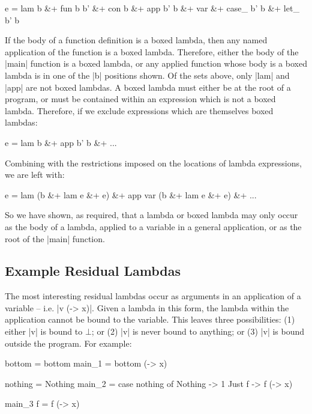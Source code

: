 \ignore\begin{code}
e =  lam b &+ fun b b' &+ con b &+ app b' b &+
     var &+ case_ b' b &+ let_ b' b
\end{code}

If the body of a function definition is a boxed lambda, then any named application of the function is a boxed lambda. Therefore, either the body of the |main| function is a boxed lambda, or any applied function whose body is a boxed lambda is in one of the |b| positions shown. Of the sets above, only |lam| and |app| are not boxed lambdas. A boxed lambda must either be at the root of a program, or must be contained within an expression which is not a boxed lambda. Therefore, if we exclude expressions which are themselves boxed lambdas:

\ignore\begin{code}
e = lam b &+ app b' b &+ ...
\end{code}

Combining with the restrictions imposed on the locations of lambda expressions, we are left with:

\ignore\begin{code}
e   = lam (b &+ lam e &+ e) &+ app var (b &+ lam e &+ e) &+ ...
\end{code}

So we have shown, as required, that a lambda or boxed lambda may only occur as the body of a lambda, applied to a variable in a general application, or as the root of the |main| function.

\subsection{Example Residual Lambdas}

The most interesting residual lambdas occur as arguments in an application of a variable -- i.e. |v (\x -> x)|. Given a lambda in this form, the lambda within the application cannot be bound to the variable. This leaves three possibilities: (1) either |v| is bound to $\bot{}$; or (2) |v| is never bound to anything; or (3) |v| is bound outside the program. For example:

\begin{code}
bottom = bottom
main_1 = bottom (\x -> x)

nothing = Nothing
main_2 = case  nothing of
               Nothing  -> 1
               Just f   -> f (\x -> x)

main_3 f = f (\x -> x)
\end{code}

